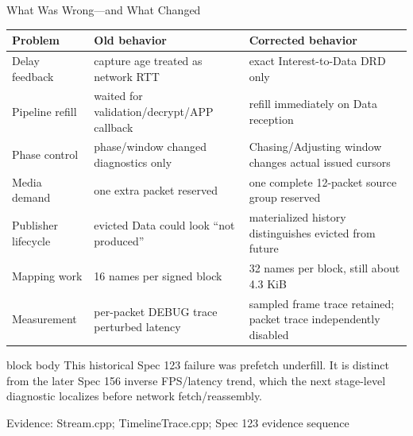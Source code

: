 \documentclass[aspectratio=169]{beamer}
\newcommand{\bluebox}[1]{%
  \begin{beamercolorbox}[rounded=true,shadow=false,sep=0.65em,wd=0.94\linewidth]{block body}
  #1
  \end{beamercolorbox}
}
\newcommand{\evidence}[1]{%
  \vfill\par\noindent
  \begin{minipage}{\linewidth}
  \raggedright{\color{SoftGray}\tiny Evidence: #1}\par
  \end{minipage}
}
\begin{document}
\begin{frame}{What Was Wrong---and What Changed}
\tiny
\renewcommand{\arraystretch}{1.08}
\begin{tabularx}{\textwidth}{p{3.25cm} Y Y}
\toprule
\textbf{Problem} & \textbf{Old behavior} & \textbf{Corrected behavior} \\
\midrule
Delay feedback & capture age treated as network RTT & exact Interest-to-Data DRD only \\
Pipeline refill & waited for validation/decrypt/APP callback & refill immediately on Data reception \\
Phase control & phase/window changed diagnostics only & Chasing/Adjusting window changes actual issued cursors \\
Media demand & one extra packet reserved & one complete 12-packet source group reserved \\
Publisher lifecycle & evicted Data could look ``not produced'' & materialized history distinguishes evicted from future \\
Mapping work & 16 names per signed block & 32 names per block, still about 4.3 KiB \\
Measurement & per-packet DEBUG trace perturbed latency & sampled frame trace retained; packet trace independently disabled \\
\bottomrule
\end{tabularx}

\vspace{0.25em}
\bluebox{This historical Spec 123 failure was prefetch underfill. It is distinct from the later Spec 156 inverse FPS/latency trend, which the next stage-level diagnostic localizes before network fetch/reassembly.}
\evidence{Stream.cpp; TimelineTrace.cpp; Spec 123 evidence sequence}
\end{frame}
\end{document}
